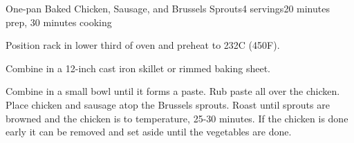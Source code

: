 \documentclass[../Cookbook.tex]{subfiles}
\begin{document}
\begin{recipe}{One-pan Baked Chicken, Sausage, and Brussels Sprouts}{4 servings}{20 minutes prep, 30 minutes cooking}

Position rack in lower third of oven and preheat to 232\0C (450\0F).

Combine in a 12-inch cast iron skillet or rimmed baking sheet.

Combine in a small bowl until it forms a paste. Rub paste all over the chicken. Place chicken and sausage atop the Brussels sprouts. Roast until sprouts are browned and the chicken is to temperature, 25-30 minutes. If the chicken is done early it can be removed and set aside until the vegetables are done.


\end{recipe}
\end{document}
